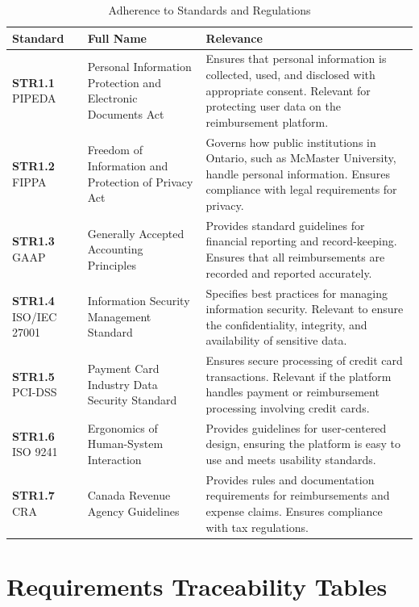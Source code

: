 \documentclass[12pt]{article}
\begin{document}
\label{STR}
\begin{table}[H]
    \centering
    \begin{tabular}{|>{\raggedright}p{3cm}|>{\raggedright}p{5cm}|>{\raggedright\arraybackslash}p{6.5cm}|}
        \hline
        \textbf{Standard} & \textbf{Full Name} & \textbf{Relevance} \\
        \hline
        \textbf{STR1.1} PIPEDA & Personal Information Protection and Electronic Documents Act & Ensures that personal information is collected, used, and disclosed with appropriate consent. Relevant for protecting user data on the reimbursement platform. \\
        \hline
        \textbf{STR1.2} FIPPA & Freedom of Information and Protection of Privacy Act & Governs how public institutions in Ontario, such as McMaster University, handle personal information. Ensures compliance with legal requirements for privacy. \\
        \hline
        \textbf{STR1.3} GAAP & Generally Accepted Accounting Principles & Provides standard guidelines for financial reporting and record-keeping. Ensures that all reimbursements are recorded and reported accurately. \\
        \hline
        \textbf{STR1.4} ISO/IEC 27001 & Information Security Management Standard & Specifies best practices for managing information security. Relevant to ensure the confidentiality, integrity, and availability of sensitive data. \\
        \hline
        \textbf{STR1.5} PCI-DSS & Payment Card Industry Data Security Standard & Ensures secure processing of credit card transactions. Relevant if the platform handles payment or reimbursement processing involving credit cards. \\
        \hline
        \textbf{STR1.6} ISO 9241 & Ergonomics of Human-System Interaction & Provides guidelines for user-centered design, ensuring the platform is easy to use and meets usability standards. \\
        \hline
        \textbf{STR1.7} CRA & Canada Revenue Agency Guidelines & Provides rules and documentation requirements for reimbursements and expense claims. Ensures compliance with tax regulations. \\
        \hline
    \end{tabular}
    \caption{Adherence to Standards and Regulations}
    \label{tab:standards}
\end{table}

\section{Requirements Traceability Tables}
\end{document}
